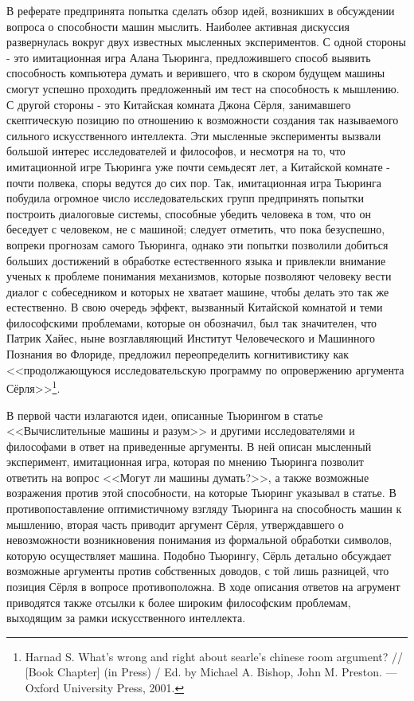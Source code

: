 \documentclass[12pt, specialist, subf, substylefile = spbu.rtx]{disser}
\begin{document}
В реферате предпринята попытка сделать обзор идей, возникших в обсуждении вопроса о способности машин мыслить. Наиболее активная дискуссия развернулась вокруг двух известных мысленных экспериментов. С одной стороны - это имитационная игра Алана Тьюринга, предложившего способ выявить способность компьютера думать и верившего, что в скором будущем машины смогут успешно проходить предложенный им тест на способность к мышлению. С другой стороны - это Китайская комната Джона Сёрля, занимавшего скептическую позицию по отношению к возможности создания так называемого сильного искусственного интеллекта. Эти мысленные эксперименты вызвали большой интерес исследователей и философов, и несмотря на то, что имитационной игре Тьюринга уже почти семьдесят лет, а Китайской комнате - почти полвека, споры ведутся до сих пор. Так, имитационная игра Тьюринга побудила огромное число исследовательских групп предпринять попытки построить диалоговые системы, способные убедить человека в том, что он беседует с человеком, не с машиной; следует отметить, что пока безуспешно, вопреки прогнозам самого Тьюринга, однако эти попытки позволили добиться больших достижений в обработке естественного языка и привлекли внимание ученых к проблеме понимания механизмов, которые позволяют человеку вести диалог с собеседником и которых не хватает машине, чтобы делать это так же естественно. В свою очередь эффект, вызванный Китайской комнатой и теми философскими проблемами, которые он обозначил, был так значителен, что Патрик Хайес, ныне возглавляющий Институт Человеческого и Машинного Познания во Флориде, предложил переопределить когнитивистику как <<продолжающуюся исследовательскую программу по опровержению аргумента Сёрля>>\footnote{\cite{Harnad2001-HARWWA} Harnad S. What’s wrong and right about searle’s chinese room argument? // [Book Chapter] (in Press) / Ed. by Michael A. Bishop, John M. Preston. — Oxford University Press, 2001.}.

В первой части излагаются идеи, описанные Тьюрингом в статье <<Вычислительные машины и разум>> и другими исследователями и философами в ответ на приведенные аргументы. В ней описан мысленный эксперимент, имитационная игра, которая по мнению Тьюринга позволит ответить на вопрос <<Могут ли машины думать?>>, а также возможные возражения против этой способности, на которые Тьюринг указывал в статье. В противопоставление оптимистичному взгляду Тьюринга на способность машин к мышлению, вторая часть приводит аргумент Сёрля, утверждавшего о невозможности возникновения понимания из формальной обработки символов, которую осуществляет машина. Подобно Тьюрингу, Сёрль детально обсуждает возможные аргументы против собственных доводов, с той лишь разницей, что позиция Сёрля в вопросе противоположна. В ходе описания ответов на агрумент приводятся также отсылки к более широким философским проблемам, выходящим за рамки искусственного интеллекта.
\end{document}
